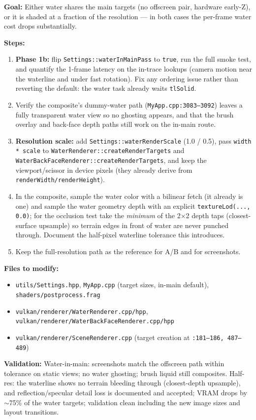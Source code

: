 \documentclass[11pt,a4paper]{article}
\begin{document}
\begin{tcolorbox}[promptbox={Prompt: Make Water-in-Main the Default and Add a Water Resolution Scale}]
\textbf{Goal:} Either water shares the main targets (no offscreen pair, hardware early-Z), or it is shaded at a
fraction of the resolution --- in both cases the per-frame water cost drops substantially.

\textbf{Steps:}
\begin{enumerate}
    \item \textbf{Phase 1b:} flip \texttt{Settings::waterInMainPass} to \texttt{true}, run the full smoke test, and
    quantify the 1-frame latency on the in-trace lookups (camera motion near the waterline and under fast rotation).
    Fix any ordering issue rather than reverting the default: the water task already waits \texttt{tlSolid}.
    \item Verify the composite's dummy-water path
    (\texttt{MyApp.cpp:3083--3092}) leaves a fully transparent water view so no ghosting appears, and that the brush
    overlay and back-face depth paths still work on the in-main route.
    \item \textbf{Resolution scale:} add \texttt{Settings::waterRenderScale} (1.0 / 0.5), pass
    \texttt{width * scale} to \texttt{WaterRenderer::createRenderTargets} and
    \texttt{WaterBackFaceRenderer::createRenderTargets}, and keep the viewport/scissor in device pixels (they already
    derive from \texttt{renderWidth/renderHeight}).
    \item In the composite, sample the water color with a bilinear fetch (it already is one) and sample the water
    geometry depth with an explicit \texttt{textureLod(..., 0.0)}; for the occlusion test take the \emph{minimum} of the
    2$\times$2 depth taps (closest-surface upsample) so terrain edges in front of water are never punched through.
    Document the half-pixel waterline tolerance this introduces.
    \item Keep the full-resolution path as the reference for A/B and for screenshots.
\end{enumerate}

\textbf{Files to modify:}
\begin{itemize}
    \item \texttt{utils/Settings.hpp}, \texttt{MyApp.cpp} (target sizes, in-main default), \texttt{shaders/postprocess.frag}
    \item \texttt{vulkan/renderer/WaterRenderer.cpp/hpp}, \texttt{vulkan/renderer/WaterBackFaceRenderer.cpp/hpp}
    \item \texttt{vulkan/renderer/SceneRenderer.cpp} (target creation at \texttt{:181--186, 487--489})
\end{itemize}

\textbf{Validation:} Water-in-main: screenshots match the offscreen path within tolerance on static views; no water
ghosting; brush liquid still composites. Half-res: the waterline shows no terrain bleeding through (closest-depth
upsample), and reflection/specular detail loss is documented and accepted; VRAM drops by $\sim$75\% of the water
targets; validation clean including the new image sizes and layout transitions.
\end{tcolorbox}
\end{document}
